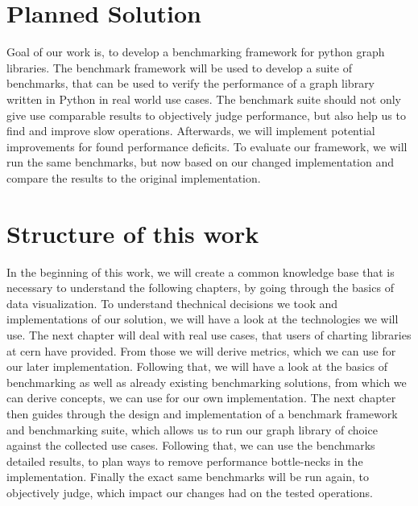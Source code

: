 
\section{Planned Solution}
\label{sec:Introduction:problem}

Goal of our work is, to develop a benchmarking framework for python graph libraries.  The benchmark framework will be used to develop a suite of benchmarks, that can be used to verify the performance of a graph library written in Python in real world use cases. The benchmark suite should not only give use comparable results to objectively judge performance, but also help us to find and improve slow operations.
Afterwards, we will implement potential improvements for found performance deficits. To evaluate our framework, we will run the same benchmarks, but now based on our changed implementation and compare the results to the original implementation.
  




\section{Structure of this work}
\label{sec:Introduction:problem}


In the beginning of this work, we will create a common knowledge base that is necessary to understand the following chapters, by going through the basics of data visualization. To understand thechnical decisions we took and implementations of our solution, we will have a look at the technologies we will use.
The next chapter will deal with real use cases, that users of charting libraries at \gls{cern} have provided. From those we will derive metrics, which we can use for our later implementation.
Following that, we will have a look at the basics of benchmarking as well as already existing benchmarking solutions, from which we can derive concepts, we can use for our own implementation.
The next chapter then guides through the design and implementation of a benchmark framework and benchmarking suite, which allows us to run our graph library of choice against the collected use cases. Following that, we can use the benchmarks detailed results, to plan ways to remove performance bottle-necks in the implementation. Finally the exact same benchmarks will be run again, to objectively judge, which impact our changes had on the tested operations.
